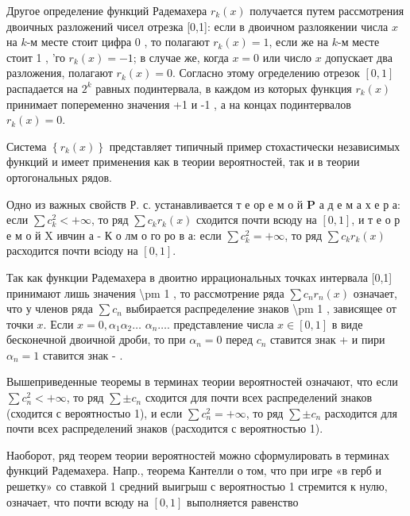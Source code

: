 \documentclass[10pt]{article}
\begin{document}
Другое определение функций Радемахера $r_{k}(x)$ получается путем рассмотрения двоичных разложений чисел отрезка [0,1]: если в двоичном разлоякении числа $x$ на $k$-м месте стоит цифра 0 , то полагают $r_{k}(x)=1$, если же на $k$-м месте стоит 1 , 'го $r_{k}(x)=-1$; в случае же, когда $x=0$ или число $x$ допускает два разложения, полагают $r_{k}(x)=0$. Согласно этому огределению отрезок $[0,1]$ распадается на $2^{k}$ равных подинтервала, в каждом из которых функция $r_{k}(x)$ принимает попеременно значения +1 и -1 , а на концах подинтервалов $r_{k}(x)=0$.



Система $\left\{r_{k}(x)\right\}$ представляет типичный пример стохастически независимых функций и имеет применения как в теории вероятностей, так и в теории ортогональных рядов.



Одно из важных свойств Р. с. устанавливается т е ор е м о й $\mathbf{P}$ а д е м а х е р а: если $\sum c_{k}^{2}<+\infty$, то ряд $\sum c_{k} r_{k}(x)$ сходится почти всюду на $[0,1]$, и т е о р е м о й $\mathrm{X}$ ивчин а - К о лм о го ро в а: если $\sum c_{k}^{2}=+\infty$, то ряд $\sum c_{k} r_{k}(x)$ расходится почти всіоду на $[0,1]$.



Так как функции Радемахера в двоитно иррациональных точках интервала [0,1] принимают лишь значения \textbackslash pm 1 , то рассмотрение ряда $\sum c_{n} r_{n}(x)$ означает, что у членов ряда $\sum c_{n}$ выбирается распределение знаков \textbackslash pm 1 , зависящее от точки $x$. Если $x=0, \alpha_{1} \alpha_{2} \ldots$ $\alpha_{n} \ldots$. представление числа $x \in[0,1]$ в виде бесконечной двоичной дроби, то при $\alpha_{n}=0$ перед $c_{n}$ ставится знак + и пири $\alpha_{n}=1$ ставится знак - .



Вышеприведенные теоремы в терминах теории вероятностей означают, что если $\sum c_{n}^{2}<+\infty$, то ряд $\sum \pm c_{n}$ сходится для почти всех распределений знаков (сходится с вероятностыо 1), и если $\sum c_{n}^{2}=+\infty$, то ряд $\sum \pm c_{n}$ расходится для почти всех распределений знаков (расходится с вероятностью 1).



Наоборот, ряд теорем теории вероятностей можно сформулировать в терминах функций Радемахера. Напр., теорема Кантелли о том, что при игре «в герб и решетку» со ставкой 1 средний выигрыш с вероятностью 1 стремится к нулю, означает, что почти всюду на $[0,1]$ выполняется равенство
\end{document}

